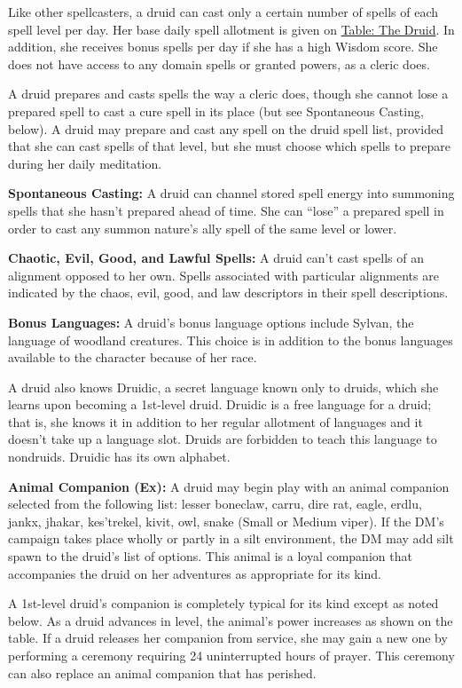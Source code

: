 Like other spellcasters, a druid can cast only a certain number of spells of each spell level per day. Her base daily spell allotment is given on \hyperref[tab:The Druid]{Table: The Druid}. In addition, she receives bonus spells per day if she has a high Wisdom score. She does not have access to any domain spells or granted powers, as a cleric does.

A druid prepares and casts spells the way a cleric does, though she cannot lose a prepared spell to cast a cure spell in its place (but see Spontaneous Casting, below). A druid may prepare and cast any spell on the druid spell list, provided that she can cast spells of  that level, but she must choose which spells to prepare during her daily meditation.

\textbf{Spontaneous Casting:} A druid can channel stored spell energy into summoning spells that she hasn't prepared ahead of time. She can ``lose'' a prepared spell in order to cast any summon nature's ally spell of the same level or lower.

\textbf{Chaotic, Evil, Good, and Lawful Spells:} A druid can't cast spells of an alignment opposed to her own. Spells associated with particular alignments are indicated by the chaos, evil, good, and law descriptors in their spell descriptions.

\textbf{Bonus Languages:} A druid's bonus language options include Sylvan, the language of woodland creatures. This choice is in addition to the bonus languages available to the character because of her race.

A druid also knows Druidic, a secret language known only to druids, which she learns upon becoming a 1st-level druid. Druidic is a free language for a druid; that is, she knows it in addition to her regular allotment of languages and it doesn't take up a language slot. Druids are forbidden to teach this language to nondruids. Druidic has its own alphabet.

\textbf{Animal Companion (Ex):} A druid may begin play with an animal companion selected from the following list: lesser boneclaw, carru, dire rat, eagle, erdlu, jankx, jhakar, kes'trekel, kivit, owl, snake (Small or Medium viper). If the DM's campaign takes place wholly or partly in a silt environment, the DM may add silt spawn to the druid's list of options. This animal is a loyal companion that accompanies the druid on her adventures as appropriate for its kind. 

A 1st-level druid's companion is completely typical for its kind except as noted below. As a druid advances in level, the animal's power increases as shown on the table. If a druid releases her companion from service, she may gain a new one by performing a ceremony requiring 24 uninterrupted hours of prayer. This ceremony can also replace an animal companion that has perished.

